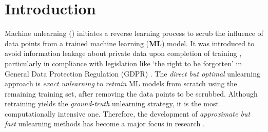 \section{Introduction}

Machine unlearning (\textbf{\MU}) initiates a reverse learning process to scrub the influence of   data points   from a trained machine learning (\textbf{ML}) model. It was  introduced to avoid information leakage about private   data upon completion of training \cite{cao2015towards, bourtoule2021machine, nguyen2022survey},
particularly in compliance with
legislation like `the right to be forgotten' \cite{rosen2011right} in General Data Protection Regulation (GDPR) \cite{hoofnagle2019european}.
The  \textit{direct but optimal} unlearning approach  is \textit{exact unlearning} to \textit{retrain}   ML models from scratch using the  remaining training set, after removing the data points to be scrubbed.
Although retraining yields the \textit{ground-truth} unlearning strategy, it is the most computationally intensive one.
Therefore,   the development of \textit{approximate but fast} unlearning methods   has  become a  major focus in research \cite{warnecke2021machine,graves2021amnesiac,thudi2021unrolling,becker2022evaluating,izzo2021approximate}.






